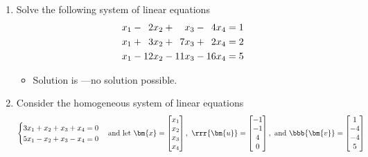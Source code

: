 \documentclass[basic]{inVerba-notes}
\begin{document}
\begin{enumerate}
\item Solve the following system of linear equations
\begin{align*}
  x_1 - \hphantom{2}2x_2 + \hphantom{22}x_3 - \hphantom{2}4x_4  &= 1 \\
  x_1 + \hphantom{2}3x_2 + \hphantom{2}7x_3 + \hphantom{2}2x_4 &= 2 \\
  x_1 - 12x_2 - 11x_3 - 16x_4        &= 5 \\
\end{align*}
\vspace*{-40pt}
\vspace*{-18pt}
\begin{itemize}\color{text}
  \item Solution is ---no solution possible.
\end{itemize}

\newpage

\item Consider the homogeneous system of linear equations
\[%
\begin{cases}
  3x_1 + x_2  + x_3 + x_4 = 0 \\
  5x_1 - x_2  + x_3 - x_4 = 0
\end{cases} 
\text{and let}~
\bm{x} = \begin{bmatrix} x_1 \\ x_2 \\ x_3 \\ x_4\end{bmatrix},~
\rrr{\bm{u}} = \begin{bmatrix} -1 \\ -1 \\ 4 \\ 0\end{bmatrix},~
\text{and}~\bbb{\bm{v}} = \begin{bmatrix} 1 \\ -4 \\ -4 \\ 5\end{bmatrix} 
\]%
\vspace{-5pt}


\end{enumerate}
\end{document}
